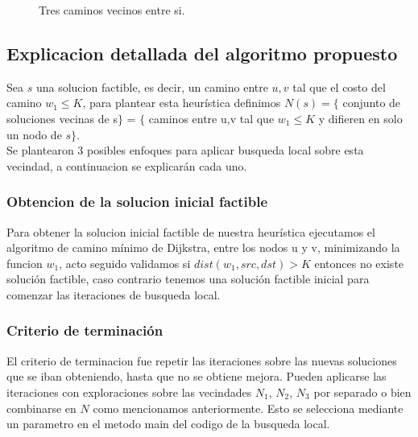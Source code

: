 \begin{figure}[H]
\centering
{}
\caption{Tres caminos vecinos entre si.}
\end{figure}

\subsection{Explicacion detallada del algoritmo propuesto}
Sea $s$ una solucion factible, es decir, un camino entre $u,v$ tal que el costo del camino $w_1 \leq K$,
para plantear esta heur\'istica definimos $N(s) = \{ $ conjunto de soluciones vecinas de s$\}$ = $\{$ caminos entre u,v tal que $w_1 \leq K$ y difieren en solo un nodo de $s\}$.\\

Se plantearon 3 posibles enfoques para aplicar busqueda local sobre esta vecindad, a continuacion se explicar\'an cada uno.

\subsubsection{Obtencion de la solucion inicial factible}

Para obtener la solucion inicial factible de nuestra heur\'istica ejecutamos el algoritmo de camino m\'inimo de Dijkstra, entre los nodos u y v, minimizando la funcion $w_1$, acto seguido validamos si $dist(w_1, src, dst) > K$ entonces no existe soluci\'on factible, caso contrario tenemos una soluci\'on factible inicial para comenzar las 
iteraciones de busqueda local.

\subsubsection{Criterio de terminaci\'on}
El criterio de terminacion fue repetir las iteraciones sobre las nuevas soluciones que se iban obteniendo, hasta que no se obtiene mejora.
Pueden aplicarse las iteraciones con exploraciones sobre las vecindades $N_1$, $N_2$, $N_3$ por separado o bien combinarse en $N$ como mencionamos anteriormente. Esto se selecciona mediante un parametro en el metodo main del codigo de la busqueda local.

